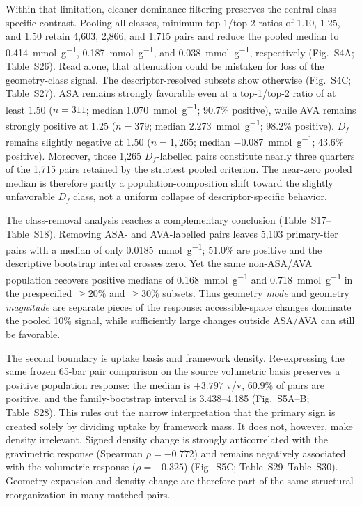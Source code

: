 \documentclass[11pt,a4paper]{article}
\newcommand{\SIfig}[1]{Fig.~S#1}
\newcommand{\SItab}[1]{Table~S#1}
\begin{document}
Within that limitation, cleaner dominance filtering preserves the central
class-specific contrast. Pooling all classes, minimum top-1/top-2 ratios of 1.10,
1.25, and 1.50 retain 4,603, 2,866, and 1,715 pairs and reduce the pooled median to
\SI{0.414}{\milli\mole\per\gram},
\SI{0.187}{\milli\mole\per\gram}, and
\SI{0.038}{\milli\mole\per\gram}, respectively
(\SIfig{4}A; \SItab{26}). Read alone, that attenuation could be mistaken for loss
of the geometry-class signal. The descriptor-resolved subsets show otherwise
(\SIfig{4}C; \SItab{27}). ASA remains strongly favorable even at a top-1/top-2
ratio of at least 1.50 ($n=311$; median
\SI{1.070}{\milli\mole\per\gram}; 90.7\% positive), while AVA remains strongly
positive at 1.25 ($n=379$; median
\SI{2.273}{\milli\mole\per\gram}; 98.2\% positive). $D_f$ remains slightly
negative at 1.50 ($n=1,265$; median
\SI{-0.087}{\milli\mole\per\gram}; 43.6\% positive). Moreover, those 1,265
$D_f$-labelled pairs constitute nearly three quarters of the 1,715 pairs retained
by the strictest pooled criterion. The near-zero pooled median is therefore partly
a population-composition shift toward the slightly unfavorable $D_f$ class, not a
uniform collapse of descriptor-specific behavior.

The class-removal analysis reaches a complementary conclusion
(\SItab{17}--\SItab{18}). Removing ASA- and AVA-labelled pairs leaves 5,103
primary-tier pairs with a median of only
\SI{0.0185}{\milli\mole\per\gram}; 51.0\% are positive and the descriptive
bootstrap interval crosses zero. Yet the same non-ASA/AVA population recovers
positive medians of \SI{0.168}{\milli\mole\per\gram} and
\SI{0.718}{\milli\mole\per\gram} in the prespecified $\geq20\%$ and
$\geq30\%$ subsets. Thus geometry \emph{mode} and geometry \emph{magnitude} are
separate pieces of the response: accessible-space changes dominate the pooled
10\% signal, while sufficiently large changes outside ASA/AVA can still be
favorable.

The second boundary is uptake basis and framework density. Re-expressing the same
frozen 65-bar pair comparison on the source volumetric basis preserves a positive
population response: the median is $+3.797$ v/v, 60.9\% of pairs are positive, and
the family-bootstrap interval is 3.438--4.185
(\SIfig{5}A--B; \SItab{28}). This rules out the narrow interpretation that the
primary sign is created solely by dividing uptake by framework mass. It does not,
however, make density irrelevant. Signed density change is strongly anticorrelated
with the gravimetric response (Spearman $\rho=-0.772$) and remains negatively
associated with the volumetric response ($\rho=-0.325$)
(\SIfig{5}C; \SItab{29}--\SItab{30}). Geometry expansion and density change are
therefore part of the same structural reorganization in many matched pairs.
\end{document}

